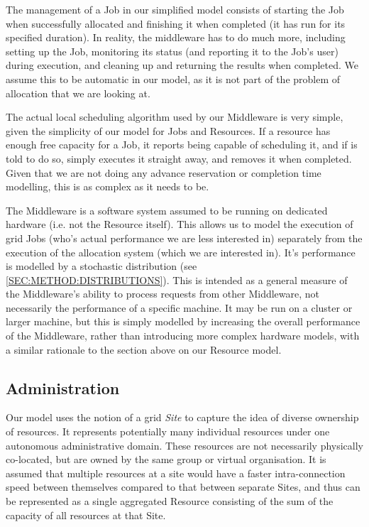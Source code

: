 The management of a Job in our simplified model consists of starting the Job
when successfully allocated and finishing it when completed (it has run for its
specified duration). In reality, the middleware has to do much more, including
setting up the Job, monitoring its status (and reporting it to the Job's user)
during execution, and cleaning up and returning the results when completed. We
assume this to be automatic in our model, as it is not part of the problem of
allocation that we are looking at.

The actual local scheduling algorithm used by our Middleware is very simple,
given the simplicity of our model for Jobs and Resources.  If a resource has
enough free capacity for a Job, it reports being capable of scheduling it, and
if is told to do so, simply executes it straight away, and removes it when
completed. Given that we are not doing any advance reservation or completion
time modelling, this is as complex as it needs to be. 

The Middleware is a software system assumed to be running on dedicated hardware
(i.e.  not the Resource itself).  This allows us to model the execution of grid
Jobs (who's actual performance we are less interested in) separately from the
execution of the allocation system (which we are interested in).  It's
performance is modelled by a stochastic distribution (see
\ref{SEC:METHOD:DISTRIBUTIONS}).  This is intended as a general measure of the
Middleware's ability to process requests from other Middleware, not necessarily
the performance of a specific machine. It may be run on a cluster or larger
machine, but this is simply modelled by increasing the overall performance of
the Middleware, rather than introducing more complex hardware models, with a
similar rationale to the section above on our Resource model.

\subsection{Administration}

Our model uses the notion of a grid \textit{Site} to capture the idea of
diverse ownership of resources. It represents potentially many individual
resources under one autonomous administrative domain. These resources are not
necessarily physically co-located, but are owned by the same group or virtual
organisation.  It is assumed that multiple resources at a site would have a
faster intra-connection speed between themselves compared to that between
separate Sites, and thus can be represented as a single aggregated Resource
consisting of the sum of the capacity of all resources at that Site.  

